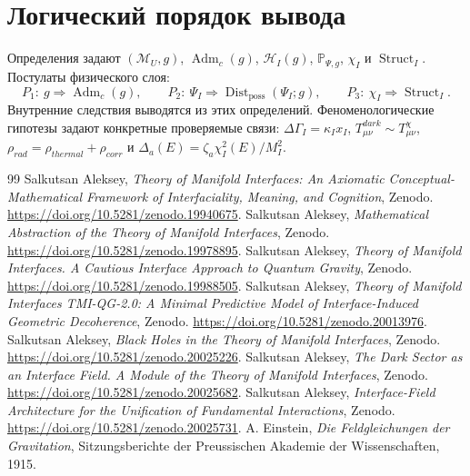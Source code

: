 \documentclass[12pt,a4paper]{article}
\DeclareMathOperator{\Adm}{Adm}
\DeclareMathOperator{\Struct}{Struct}
\DeclareMathOperator{\Dist}{Dist}
\newcommand{\M}{\mathcal M_U}
\newcommand{\Hilb}{\mathcal H}
\newcommand{\Prob}{\mathbb P}
\begin{document}
\section{Логический порядок вывода}
Определения задают $(\M,g)$, $\Adm_c(g)$, $\Hilb_I(g)$, $\Prob_{\Psi,g}$, $\chi_I$ и $\Struct_I$. Постулаты физического слоя:
\[
\boxed{P_1:\ g\Rightarrow\Adm_c(g),}
\qquad
\boxed{P_2:\ \Psi_I\Rightarrow\Dist_{\mathrm{poss}}(\Psi_I;g),}
\qquad
\boxed{P_3:\ \chi_I\Rightarrow\Struct_I.}
\]
Внутренние следствия выводятся из этих определений. Феноменологические гипотезы задают конкретные проверяемые связи: $\Delta\Gamma_I=\kappa_Ix_I$, $T_{\mu\nu}^{dark}\sim T_{\mu\nu}^{\chi}$, $\rho_{rad}=\rho_{thermal}+\rho_{corr}$ и $\Delta_a(E)=\zeta_a\chi_I^2(E)/M_I^2$.

\begin{thebibliography}{99}
 Salkutsan Aleksey, \textit{Theory of Manifold Interfaces: An Axiomatic Conceptual-Mathematical Framework of Interfaciality, Meaning, and Cognition}, Zenodo. \href{https://doi.org/10.5281/zenodo.19940675}{https://doi.org/10.5281/zenodo.19940675}.
 Salkutsan Aleksey, \textit{Mathematical Abstraction of the Theory of Manifold Interfaces}, Zenodo. \href{https://doi.org/10.5281/zenodo.19978895}{https://doi.org/10.5281/zenodo.19978895}.
 Salkutsan Aleksey, \textit{Theory of Manifold Interfaces. A Cautious Interface Approach to Quantum Gravity}, Zenodo. \href{https://doi.org/10.5281/zenodo.19988505}{https://doi.org/10.5281/zenodo.19988505}.
 Salkutsan Aleksey, \textit{Theory of Manifold Interfaces TMI-QG-2.0: A Minimal Predictive Model of Interface-Induced Geometric Decoherence}, Zenodo. \href{https://doi.org/10.5281/zenodo.20013976}{https://doi.org/10.5281/zenodo.20013976}.
 Salkutsan Aleksey, \textit{Black Holes in the Theory of Manifold Interfaces}, Zenodo. \href{https://doi.org/10.5281/zenodo.20025226}{https://doi.org/10.5281/zenodo.20025226}.
 Salkutsan Aleksey, \textit{The Dark Sector as an Interface Field. A Module of the Theory of Manifold Interfaces}, Zenodo. \href{https://doi.org/10.5281/zenodo.20025682}{https://doi.org/10.5281/zenodo.20025682}.
 Salkutsan Aleksey, \textit{Interface-Field Architecture for the Unification of Fundamental Interactions}, Zenodo. \href{https://doi.org/10.5281/zenodo.20025731}{https://doi.org/10.5281/zenodo.20025731}.
 A. Einstein, \textit{Die Feldgleichungen der Gravitation}, Sitzungsberichte der Preussischen Akademie der Wissenschaften, 1915.

\end{thebibliography}
\end{document}
